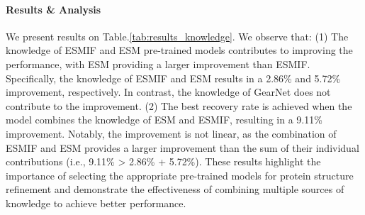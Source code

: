 \documentclass{article}
\begin{document}
\begin{table}[h]
   \centering
   \caption{Ablation study on multimodal knowledge. We investigate how much performance gain the model can obtain from different pre-trained models, where ESM+ESMIF provides the best performance. }
   \label{tab:results_knowledge}
   \vspace{-3mm}
\end{table}

\paragraph{Results \& Analysis} We present results on Table.\ref{tab:results_knowledge}. We observe that: (1) The knowledge of ESMIF and ESM pre-trained models contributes to improving the performance, with ESM providing a larger improvement than ESMIF. Specifically, the knowledge of ESMIF and ESM results in a 2.86\% and 5.72\% improvement, respectively. In contrast, the knowledge of GearNet does not contribute to the improvement. (2) The best recovery rate is achieved when the model combines the knowledge of ESM and ESMIF, resulting in a 9.11\% improvement. Notably, the improvement is not linear, as the combination of ESMIF and ESM provides a larger improvement than the sum of their individual contributions (i.e., 9.11\% > 2.86\% + 5.72\%). These results highlight the importance of selecting the appropriate pre-trained models for protein structure refinement and demonstrate the effectiveness of combining multiple sources of knowledge to achieve better performance.
\end{document}
